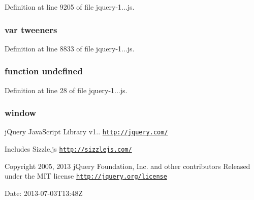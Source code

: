 Definition at line 9205 of file jquery-\/1...\+js.

\hypertarget{_scripts_2jquery-1_810_82_8js_a948afd2431eec272c99689edddfb6850}{}
\subsubsection[{tweeners}]{\setlength{\rightskip}{0pt plus 5cm}var tweeners}\label{_scripts_2jquery-1_810_82_8js_a948afd2431eec272c99689edddfb6850}


Definition at line 8833 of file jquery-\/1...\+js.

\hypertarget{_scripts_2jquery-1_810_82_8js_a08113a236cc18d2a9d5ce27e638012be}{}
\subsubsection[{undefined}]{\setlength{\rightskip}{0pt plus 5cm}function undefined}\label{_scripts_2jquery-1_810_82_8js_a08113a236cc18d2a9d5ce27e638012be}


Definition at line 28 of file jquery-\/1...\+js.

\hypertarget{_scripts_2jquery-1_810_82_8js_a04a8a2bbfa9c15500892b8e5033d625b}{}
\subsubsection[{window}]{\setlength{\rightskip}{0pt plus 5cm}window}\label{_scripts_2jquery-1_810_82_8js_a04a8a2bbfa9c15500892b8e5033d625b}
j\+Query Java\+Script Library v1.. \href{http://jquery.com/}{\tt http\+://jquery.\+com/}

Includes Sizzle.\+js \href{http://sizzlejs.com/}{\tt http\+://sizzlejs.\+com/}

Copyright 2005, 2013 j\+Query Foundation, Inc. and other contributors Released under the M\+I\+T license \href{http://jquery.org/license}{\tt http\+://jquery.\+org/license}

Date\+: 2013-\/07-\/03\+T13\+:48\+Z 

